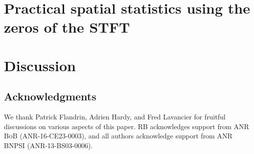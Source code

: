 \documentclass{article}
\theoremstyle{plain}
\theoremstyle{remark}
\begin{document}
\section{Practical spatial statistics using the zeros of the STFT}
\label{s:stats}



\section{Discussion}
\label{s:discussion}


\subsection*{Acknowledgments}
We thank Patrick Flandrin, Adrien Hardy, and Fred Lavancier for fruitful
discussions on various aspects of this paper. RB acknowledges support from ANR
\textsc{BoB} (ANR-16-CE23-0003), and all authors acknowledge support from
ANR \textsc{BNPSI} (ANR-13-BS03-0006).


\end{document}
